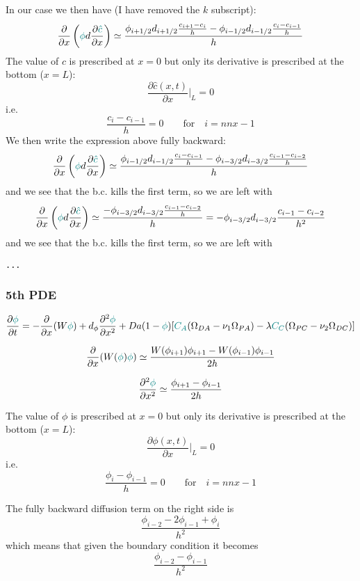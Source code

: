 \documentclass[a4paper]{article}
\newcommand{\nn}{\nonumber}
\begin{document}
In our case we then have (I have removed the $k$ subscript):
\[
\frac{\partial}{\partial x} 
\left( {\color{teal}\phi} d 
\frac{\partial {\color{teal}\hat{c}}}{\partial x} \right)
\simeq 
\frac{
\phi_{i+1/2} d_{i+1/2} \frac{c_{i+1}-c_i}{h}
-
\phi_{i-1/2} d_{i-1/2} \frac{c_{i}-c_{i-1}}{h}
}{h}
\]
The value of $c$ is prescribed at $x=0$ but only its derivative
is prescribed at the bottom ($x=L$):
\[
\frac{\partial \hat{c} (x,t)}{\partial x}|_L = 0
\]
i.e.
\[
\frac{c_i-c_{i-1}}{h}=0  \qquad \text{for} \quad i=nnx-1
\] 
We then write the expression above fully backward:
\[
\frac{\partial}{\partial x} 
\left( {\color{teal}\phi} d 
\frac{\partial {\color{teal}\hat{c}}}{\partial x} \right)
\simeq 
\frac{
\phi_{i-1/2} d_{i-1/2} \frac{c_{i}-c_{i-1}}{h}
-
\phi_{i-3/2} d_{i-3/2} \frac{c_{i-1}-c_{i-2}}{h}
}{h}
\]
and we see that the b.c. kills the first term, so we are left with
\[
\frac{\partial}{\partial x} 
\left( {\color{teal}\phi} d 
\frac{\partial {\color{teal}\hat{c}}}{\partial x} \right)
\simeq 
\frac{-\phi_{i-3/2} d_{i-3/2} \frac{c_{i-1}-c_{i-2}}{h}}{h}
=
-\phi_{i-3/2} d_{i-3/2} \frac{c_{i-1}-c_{i-2}}{h^2}
\]
and we see that the b.c. kills the first term, so we are left with





\begin{lstlisting}
...
\end{lstlisting}

\subsubsection*{5th PDE}








\[
\frac{\partial {\color{teal}\phi}}{\partial t} 
= -\frac{\partial}{\partial x} (W {\color{teal}\phi})
+d_{\phi} \frac{\partial^2 {\color{teal}\phi}}{\partial x^2} + Da (1-{\color{teal}\phi})
[{\color{teal}C_A}(\Omega_{DA}-\nu_1 \Omega_{PA})-\lambda 
{\color{teal}C_C} (\Omega_{PC}-\nu_2 \Omega_{DC})] \nn
\]

\[
\frac{\partial}{\partial x} (W ({\color{teal}\phi}) {\color{teal}\phi})
\simeq
\frac{W(\phi_{i+1})\phi_{i+1}-  W(\phi_{i-1})\phi_{i-1}}{2h}
\]

\[
\frac{\partial^2 {\color{teal}\phi}}{\partial x^2}
\simeq \frac{\phi_{i+1}-\phi_{i-1}}{2h}  
\]


The value of $\phi$ is prescribed at $x=0$ but only its derivative
is prescribed at the bottom ($x=L$):
\[
\frac{\partial \phi (x,t)}{\partial x}|_L = 0
\]
i.e.
\[
\frac{\phi_i-\phi_{i-1}}{h}=0  \qquad \text{for} \quad i=nnx-1
\] 

The fully backward diffusion term on the right side is 
\[
\frac{\phi_{i-2}-2\phi_{i-1}+\phi_i}{h^2}
\]
which means that given the boundary condition it becomes
\[
\frac{\phi_{i-2}-\phi_{i-1}}{h^2}
\]

\printbibliography
\end{document}
